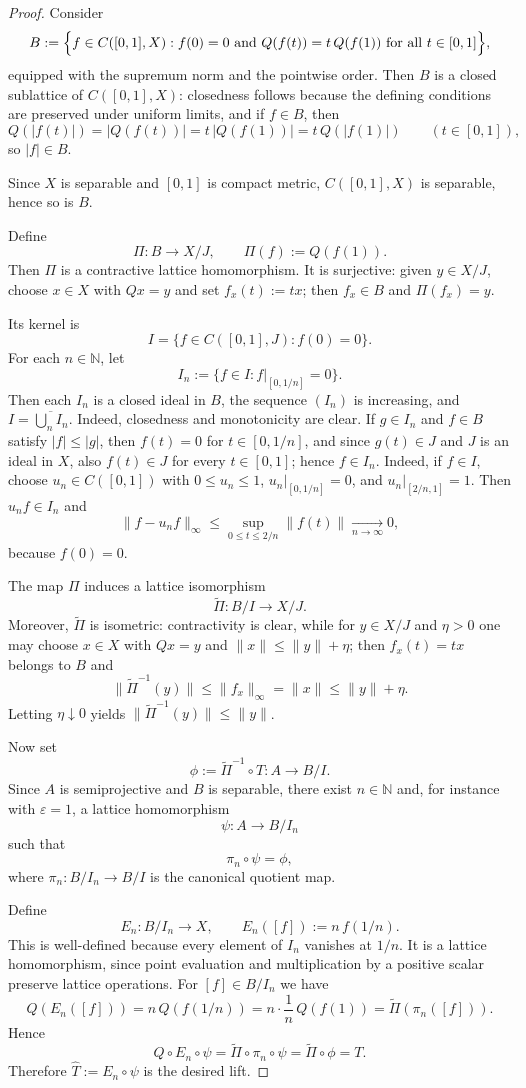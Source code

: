 \documentclass[10pt,a4paper]{amsart}
\renewcommand{\le}{\leqslant}
\begin{document}
\begin{proof}
Consider
\[
B:=\Bigl\{f\in C([0,1],X): f(0)=0
\text{ and } Q(f(t))=t\,Q(f(1)) \text{ for all } t\in[0,1]\Bigr\},
\]
equipped with the supremum norm and the pointwise order.
Then \(B\) is a closed sublattice of \(C([0,1],X)\): closedness follows because the
defining conditions are preserved under uniform limits, and if \(f\in B\), then
\[
Q(|f(t)|)=|Q(f(t))|=t\,|Q(f(1))|=t\,Q(|f(1)|)
\qquad (t\in[0,1]),
\]
so \(|f|\in B\).

Since $X$ is separable and $[0,1]$ is compact metric, $C([0,1],X)$ is separable,
hence so is $B$.

Define
\[
\Pi\colon B\to X/J,\qquad \Pi(f):=Q(f(1)).
\]
Then $\Pi$ is a contractive lattice homomorphism.
It is surjective: given $y\in X/J$, choose $x\in X$ with $Qx=y$ and set
$f_x(t):=tx$; then $f_x\in B$ and $\Pi(f_x)=y$.

Its kernel is
\[
I=\{f\in C([0,1],J): f(0)=0\}.
\]
For each $n\in\mathbb N$, let
\[
I_n:=\{f\in I: f|_{[0,1/n]}=0\}.
\]
Then each \(I_n\) is a closed ideal in \(B\), the sequence \((I_n)\) is increasing,
and \(I=\overline{\bigcup_n I_n}\). Indeed, closedness and monotonicity are clear. If
\(g\in I_n\) and \(f\in B\) satisfy \(|f|\le |g|\), then \(f(t)=0\) for \(t\in[0,1/n]\),
and since \(g(t)\in J\) and \(J\) is an ideal in \(X\), also \(f(t)\in J\) for every
\(t\in[0,1]\); hence \(f\in I_n\).
Indeed, if $f\in I$, choose $u_n\in C([0,1])$ with
$0\le u_n\le 1$, $u_n|_{[0,1/n]}=0$, and $u_n|_{[2/n,1]}=1$.
Then $u_nf\in I_n$ and
\[
\|f-u_nf\|_\infty\le \sup_{0\le t\le 2/n}\|f(t)\|\xrightarrow[n\to\infty]{}0,
\]
because $f(0)=0$.

The map $\Pi$ induces a lattice isomorphism
\[
\widetilde\Pi\colon B/I\to X/J.
\]
Moreover, $\widetilde\Pi$ is isometric: contractivity is clear, while for
$y\in X/J$ and $\eta>0$ one may choose $x\in X$ with $Qx=y$ and
$\|x\|\le \|y\|+\eta$; then $f_x(t)=tx$ belongs to $B$ and
\[
\|\widetilde\Pi^{-1}(y)\|\le \|f_x\|_\infty=\|x\|\le \|y\|+\eta.
\]
Letting $\eta\downarrow 0$ yields $\|\widetilde\Pi^{-1}(y)\|\le \|y\|$.

Now set
\[
\phi:=\widetilde\Pi^{-1}\circ T\colon A\to B/I.
\]
Since $A$ is semiprojective and $B$ is separable, there exist $n\in\mathbb N$
and, for instance with $\varepsilon=1$, a lattice homomorphism
\[
\psi\colon A\to B/I_n
\]
such that
\[
\pi_n\circ \psi=\phi,
\]
where $\pi_n\colon B/I_n\to B/I$ is the canonical quotient map.

Define
\[
E_n\colon B/I_n\to X,\qquad E_n([f]):=n\,f(1/n).
\]
This is well-defined because every element of $I_n$ vanishes at $1/n$.
It is a lattice homomorphism, since point evaluation and multiplication by a
positive scalar preserve lattice operations.
For $[f]\in B/I_n$ we have
\[
Q(E_n([f]))
=n\,Q(f(1/n))
=n\cdot \frac1n\,Q(f(1))
=\widetilde\Pi(\pi_n([f])).
\]
Hence
\[
Q\circ E_n\circ \psi
=\widetilde\Pi\circ \pi_n\circ \psi
=\widetilde\Pi\circ \phi
=T.
\]
Therefore $\widehat T:=E_n\circ \psi$ is the desired lift.
\end{proof}
\end{document}

